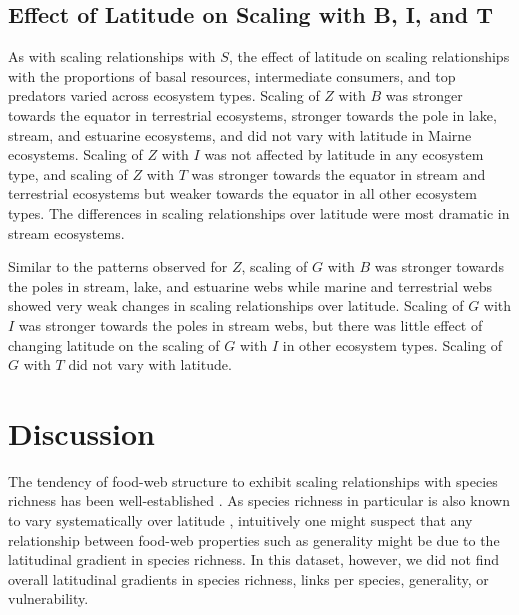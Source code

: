 \documentclass[12pt]{article}
\begin{document}
\subsection*{Effect of Latitude on Scaling with B, I, and T}

As with scaling relationships with $S$, the effect of latitude on scaling relationships
with the proportions of basal resources, intermediate consumers, and top predators
varied across ecosystem types. Scaling of $Z$ with $B$ was stronger towards the equator in terrestrial
ecosystems, stronger towards the pole in lake, stream, and estuarine ecosystems, and did not vary
with latitude in Mairne ecosystems. Scaling of $Z$ with $I$ was not affected by latitude in any
ecosystem type, and scaling of $Z$ with $T$ was stronger towards the equator in stream and terrestrial
ecosystems but weaker towards the equator in all other ecosystem types. The differences in scaling
relationships over latitude were most dramatic in stream ecosystems.


Similar to the patterns observed for $Z$, scaling of $G$ with $B$ was stronger towards the poles
in stream, lake, and estuarine webs while marine and terrestrial webs showed very weak changes
in scaling relationships over latitude. Scaling of $G$ with $I$ was stronger towards the poles in stream
webs, but there was little effect of changing latitude on the scaling of $G$ with $I$ in other ecosystem
types. Scaling of $G$ with $T$ did not vary with latitude.




\section*{Discussion}

The tendency of food-web structure to exhibit scaling relationships with
species richness has been well-established \citep{Dunne2004,Riede2010}. As
species richness in particular is also known to vary systematically over
latitude \citep{}, intuitively one might suspect that any relationship
between food-web properties such as generality might be due to the latitudinal
gradient in species richness. In this dataset, however, we did not find
overall latitudinal gradients in species richness, links per species, 
generality, or vulnerability. 
\end{document}
